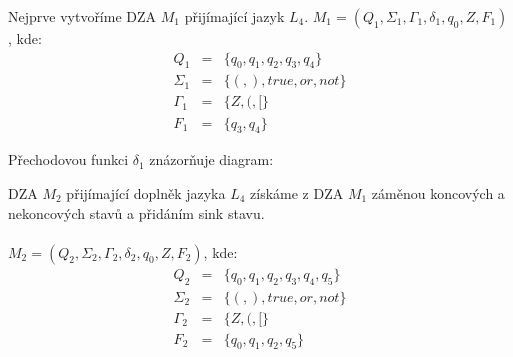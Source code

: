 \documentclass[a4paper,11pt]{article}[24.3.2010]
\begin{document}
\begin{enumerate}
Nejprve vytvoříme DZA $M_1$ přijímající jazyk $L_{4}$. $M_1 = (Q_{1}, \Sigma_{1}, \Gamma_{1}, \delta_{1}, q_{0}, Z, F_{1})$, kde:
  \begin{eqnarray*}
    Q_{1}&=&\{q_{0}, q_{1}, q_{2}, q_{3}, q_{4}\}\\
    \Sigma_{1}&=&\{(,),true,or,not\}\\
    \Gamma_{1}&=&\{Z,(,[\}\\
    F_{1}&=&\{q_{3},q_{4}\}
  \end{eqnarray*}

  Přechodovou funkci $\delta_{1}$ znázorňuje diagram:\\

\begin{figure}[h!]
        \begin{center}
        \end{center}
        \end{figure}

  \newpage

  DZA $M_2$ přijímající doplněk jazyka $L_{4}$ získáme z DZA $M_1$ záměnou koncových a nekoncových stavů a přidáním sink stavu.\\\\
$M_2 = (Q_{2}, \Sigma_{2}, \Gamma_{2}, \delta_{2}, q_{0}, Z, F_{2})$, kde:
  \begin{eqnarray*}
    Q_{2}&=&\{q_{0}, q_{1}, q_{2}, q_{3}, q_{4}, q_{5}\}\\
   \Sigma_{2}&=&\{(,),true,or,not\}\\
   \Gamma_{2}&=&\{Z,(,[\}\\
    F_{2}&=&\{q_{0}, q_{1}, q_{2}, q_{5}\}
  \end{eqnarray*}


\end{enumerate}
\end{document}
